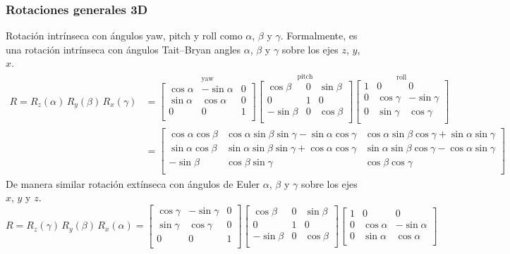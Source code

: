 \begin{frame}
    \frametitle{Rotaciones generales 3D}
    \tiny
    Rotación intrínseca con ángulos yaw, pitch y roll como $\alpha$, $\beta$ y $\gamma$. Formalmente, es una rotación intrínseca con ángulos Tait–Bryan angles $\alpha$, $\beta$ y $\gamma$ sobre los ejes $z$, $y$, $x$.
    \begin{equation*}
        {\displaystyle {\begin{aligned}R=R_{z}(\alpha )\,R_{y}(\beta )\,R_{x}(\gamma )&={\overset {\text{yaw}}{\begin{bmatrix}\cos \alpha &-\sin \alpha &0\\\sin \alpha &\cos \alpha &0\\0&0&1\\\end{bmatrix}}}{\overset {\text{pitch}}{\begin{bmatrix}\cos \beta &0&\sin \beta \\0&1&0\\-\sin \beta &0&\cos \beta \\\end{bmatrix}}}{\overset {\text{roll}}{\begin{bmatrix}1&0&0\\0&\cos \gamma &-\sin \gamma \\0&\sin \gamma &\cos \gamma \\\end{bmatrix}}}\\&={\begin{bmatrix}\cos \alpha \cos \beta &\cos \alpha \sin \beta \sin \gamma -\sin \alpha \cos \gamma &\cos \alpha \sin \beta \cos \gamma +\sin \alpha \sin \gamma \\\sin \alpha \cos \beta &\sin \alpha \sin \beta \sin \gamma +\cos \alpha \cos \gamma &\sin \alpha \sin \beta \cos \gamma -\cos \alpha \sin \gamma \\-\sin \beta &\cos \beta \sin \gamma &\cos \beta \cos \gamma \\\end{bmatrix}}\end{aligned}}}
    \end{equation*}
     De manera similar rotación extínseca con ángulos de Euler $\alpha$, $\beta$ y $\gamma$ sobre los ejes $x$, $y$ y $z$.
    \begin{equation*}
        {\displaystyle R=R_{z}(\gamma )\,R_{y}(\beta )\,R_{x}(\alpha )={\begin{bmatrix}\cos \gamma &-\sin \gamma &0\\\sin \gamma &\cos \gamma &0\\0&0&1\\\end{bmatrix}}{\begin{bmatrix}\cos \beta &0&\sin \beta \\0&1&0\\-\sin \beta &0&\cos \beta \\\end{bmatrix}}{\begin{bmatrix}1&0&0\\0&\cos \alpha &-\sin \alpha \\0&\sin \alpha &\cos \alpha \\\end{bmatrix}}}

\end{equation*}
\end{frame}
